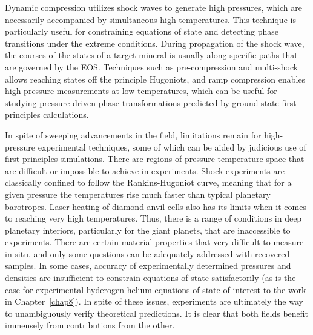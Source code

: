 Dynamic compression utilizes shock waves to generate high pressures, which are
necessarily accompanied by simultaneous high temperatures. This technique is
particularly useful for constraining equations of state and detecting phase
transitions under the extreme conditions. During propagation of the shock wave,
the courses of the states of a target mineral is usually along specific paths
that are governed by the EOS. Techniques such as pre-compression and
multi-shock allows reaching states off the principle Hugoniots, and ramp
compression enables high pressure measurements at low temperatures, which can
be useful for studying pressure-driven phase transformations predicted by
ground-state first-principles calculations.

In spite of sweeping advancements in the field, limitations remain for
high-pressure experimental techniques, some of which can be aided by judicious
use of first principles simulations. There are regions of pressure temperature
space that are difficult or impossible to achieve in experiments. Shock
experiments are classically confined to follow the Rankins-Hugoniot curve,
meaning that for a given pressure the temperatures rise much faster than
typical planetary barotropes. Laser heating of diamond anvil cells also has its
limits when it comes to reaching very high temperatures. Thus, there is a range
of conditions in deep planetary interiors, particularly for the giant planets,
that are inaccessible to experiments. There are certain material properties
that very difficult to measure in situ, and only some questions can be
adequately addressed with recovered samples. In some cases, accuracy of
experimentally determined pressures and densities are insufficient to constrain
equations of state satisfactorily (as is the case for experimental
hyderogen-helium equations of state of interest to the work in
Chapter~\ref{chap8}). In spite of these issues, experiments are ultimately the
way to unambiguously verify theoretical predictions. It is clear that both
fields benefit immensely from contributions from the other.

